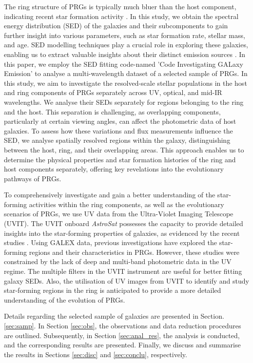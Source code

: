 \documentclass{pas}
\begin{document}
The ring structure of PRGs is typically much bluer than the host component, indicating recent star formation activity \citep{2022Mosenkov,2024akr}. In this study, we obtain the spectral energy distribution (SED) of the galaxies and their subcomponents to gain further insight into various parameters, such as star formation rate, stellar mass, and age. SED modelling techniques play a crucial role in exploring these galaxies, enabling us to extract valuable insights about their distinct emission sources \citep{1989Cardelli_SED,2005Burgarella_SED}. In this paper, we employ the SED fitting code-named 'Code Investigating GALaxy Emission' \citep[CIGALE; ][]{2005Burgarella_SED,2009Noll_cigale,2019Boquien} to analyse a multi-wavelength dataset of a selected sample of PRGs. {In this study, we aim to investigate the resolved-scale stellar populations in the host and ring components of PRGs separately across UV, optical, and mid-IR wavelengths. We analyse their SEDs separately for regions belonging to the ring and the host. This separation is challenging, as overlapping components, particularly at certain viewing angles, can affect the photometric data of host galaxies. To assess how these variations and flux measurements influence the SED, we analyse spatially resolved regions within the galaxy, distinguishing between the host, ring, and their overlapping areas.} This approach enables us to determine the physical properties and star formation histories of the ring and host components separately, offering key revelations into the evolutionary pathways of PRGs. \par

To comprehensively investigate and gain a better understanding of the star-forming activities within the ring components, as well as the evolutionary scenarios of PRGs, we use UV data from the Ultra-Violet Imaging Telescope (UVIT). The UVIT onboard {\it AstroSat} possesses the capacity to provide detailed insights into the star-forming properties of galaxies, as evidenced by the recent studies \citep{2018george,2022UK,2023Ashish,2024Mayya,2024Sundar,2024Leahy,2024Ujjwal,2024Robinjigsaw,2024robin,2025Shashank}. Using GALEX data, previous investigations \citep{marino2009,ordernes2016A&A...585A.156O} have explored the star-forming regions and their characteristics in PRGs. However, these studies were constrained by the lack of deep and multi-band photometric data in the UV regime. The multiple filters in the UVIT instrument are useful for better fitting galaxy SEDs. Also, the utilisation of UV images from UVIT to identify and study star-forming regions in the ring is anticipated to provide a more detailed understanding of the evolution of PRGs. \par
Details regarding the selected sample of galaxies are presented in Section. \ref{sec:samp}. In Section \ref{sec:obs}, the observations and data reduction procedures are outlined. Subsequently, in Section \ref{sec:anal_res}, the analysis is conducted, and the corresponding results are presented. Finally, we discuss and summarise the results in Sections \ref{sec:disc} and \ref{sec:conclu}, respectively.
\end{document}
